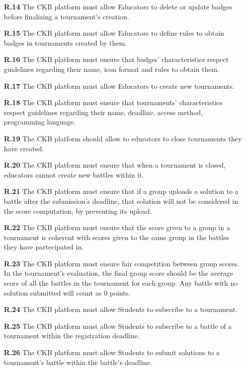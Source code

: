 \documentclass{article}
\begin{document}
{\begin{itemize}
    \item[\textbf{R.14}] The CKB platform must allow Educators to delete or update badges before finalizing a tournament's creation.
    \item[\textbf{R.15}] The CKB platform must allow Educators to define rules to obtain badges in tournaments created by them.
    \item[\textbf{R.16}] The CKB platform must ensure that badges' characteristics respect guidelines regarding their
          name, icon format and rules to obtain them.
    \item[\textbf{R.17}] The CKB platform must allow Educators to create new tournaments.
    \item[\textbf{R.18}] The CKB platform must ensure that tournaments' characteristics respect guidelines regarding their
          name, deadline, access method, programming language.
    \item[\textbf{R.19}] The CKB platform should allow to educators to close tournaments they have created.
    \item[\textbf{R.20}] The CKB platform must ensure that when a tournament is closed, educators cannot create new battles
          within it.
    \item[\textbf{R.21}] The CKB platform must ensure that if a group uploads a solution to a battle after the submission's deadline,
          that solution will not be considered in the score computation, by preventing its upload.
    \item[\textbf{R.22}] The CKB platform must ensure that the score given to a group in a tournament is
          coherent with scores given to the same group in the battles they have partecipated in.
    \item[\textbf{R.23}] The CKB platform must ensure fair competition between group scores. In the tournament's evaluation, the final
          group score should be the average score of all the battles in the tournament for each group. Any battle with no solution submitted will count
          as 0 points.
    \item[\textbf{R.24}] The CKB platform must allow Students to subscribe to a tournament.
    \item[\textbf{R.25}] The CKB platform must allow Students to subscribe to a battle of a tournament
          within the registration deadline.
    \item[\textbf{R.26}] The CKB platform must allow Students to submit solutions to a tournament's battle
          within the battle's deadline.

\end{itemize}}
\end{document}
